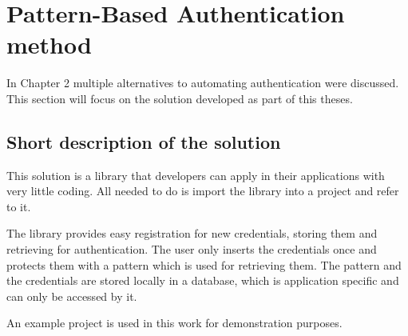 
\chapter{Pattern-Based Authentication method} %

In Chapter 2 multiple alternatives to automating authentication were discussed. This section will focus on the solution developed as part of this theses. 



\ifpdf
    \graphicspath{{X/figures/PNG/}{X/figures/PDF/}{X/figures/}}
\else
    \graphicspath{{X/figures/EPS/}{X/figures/}}
\fi

\section{Short description of the solution}
This solution is a library that developers can apply in their applications with very little coding. All needed to do is import the library into a project and refer to it.

The library provides easy registration for new credentials, storing them and retrieving for authentication. The user only inserts the credentials once and protects them with a pattern which is used for retrieving them. The pattern and the credentials are stored locally in a database, which is application specific and can only be accessed by it. 

An example project is used in this work for demonstration purposes.

\newpage

